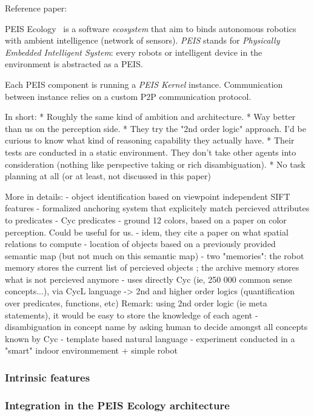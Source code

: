 \documentclass[a4paper]{article}
\begin{document}
Reference paper:~\cite{Daoutis2009}

{\sc PEIS Ecology}~\cite{Saffiotti2005} is a software \emph{ecosystem} that aim to binds autonomous
robotics with ambient intelligence (network of sensors). \emph{PEIS} stands for
\emph{Physically Embedded Intelligent System}: every robots or intelligent
device in the environment is abstracted as a PEIS.

Each PEIS component is running a \emph{PEIS Kernel} instance. Communication
between instance relies on a custom P2P communication protocol.

In short:
* Roughly the same kind of ambition and architecture.
* Way better than us on the perception side. 
* They try the "2nd order logic" approach. I'd be curious to know what kind of reasoning capability they actually have.
* Their tests are conducted in a static environment. They don't take other agents into consideration (nothing like perspective taking or rich disambiguation).
* No task planning at all (or at least, not discussed in this paper)

More in details:
- object identification based on viewpoint independent SIFT features
- formalized anchoring system that explicitely match percieved attributes to predicates
- Cyc predicates
- ground 12 colors, based on a paper on color perception. Could be useful for us.
- idem, they cite a paper on what spatial relations to compute
- location of objects based on a previously provided semantic map (but not much on this semantic map)
- two "memories": the robot memory stores the current list of percieved objects ; the archive memory stores what is not percieved anymore
- uses directly Cyc (ie, 250 000 common sense concepts...), via CycL language -> 2nd and higher order logics (quantification over predicates, functions, etc)
Remark: using 2nd order logic (ie meta statements), it would be easy to store the knowledge of each agent
- disambiguation in concept name by asking human to decide amongst all concepts known by Cyc
- template based natural language
- experiment conducted in a "smart" indoor environmement + simple robot

\subsubsection{Intrinsic features}
\label{sect|peis-intrinsic-features}

\subsubsection{Integration in the PEIS Ecology architecture}
\label{sect|peis-integration}
\end{document}
